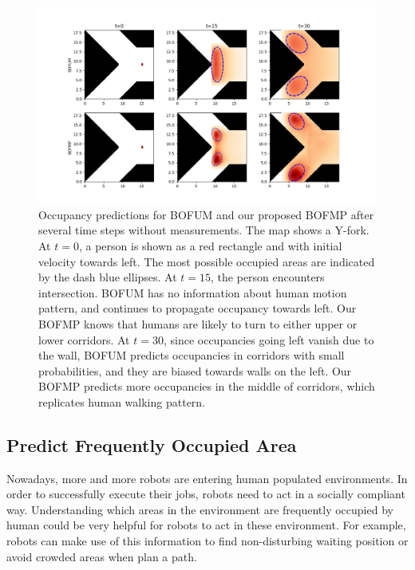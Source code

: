 \begin{figure}[ht]
  \centering
    \includegraphics[width=\textwidth]{figures/idea_1.png}
    \caption[Occupancy predictions for BOFUM and our proposed BOFMP.]{Occupancy predictions for BOFUM and our proposed BOFMP after several time steps without measurements. The map shows a Y-fork. At $t=0$, a person is shown as a red rectangle and with initial velocity towards left. The most possible occupied areas are indicated by the dash blue ellipses. At $t=15$, the person encounters intersection. BOFUM has no information about human motion pattern, and continues to propagate occupancy towards left. Our BOFMP knows that humans are likely to turn to either upper or lower corridors. At $t=30$, since occupancies going left vanish due to the wall, BOFUM predicts occupancies in corridors with small probabilities, and they are biased towards walls on the left. Our BOFMP predicts more occupancies in the middle of corridors, which replicates human walking pattern.}
    \label{fig:idea}
\end{figure}

\subsection{Predict Frequently Occupied Area}
Nowadays, more and more robots are entering human populated environments. In order to successfully execute their jobs, robots need to act in a socially compliant way. Understanding which areas in the environment are frequently occupied by human could be very helpful for robots to act in these environment. For example, robots can make use of this information to find non-disturbing waiting position or avoid crowded areas when plan a path. 

